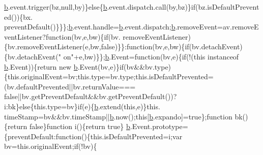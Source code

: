 \begin{DoxyCode}
      \hyperlink{docs_2_programmer's_manual_2html_2jquery_8js_aa4026ad5544b958e54ce5e106fa1c805}{b}.event.trigger(bz,null,by)\}\textcolor{keywordflow}{else}\{\hyperlink{docs_2_programmer's_manual_2html_2jquery_8js_aa4026ad5544b958e54ce5e106fa1c805}{b}.event.dispatch.call(by,bz)\}\textcolor{keywordflow}{if}(bz.isDefaultPrevented())\{bx.
      preventDefault()\}\}\};\hyperlink{docs_2_programmer's_manual_2html_2jquery_8js_aa4026ad5544b958e54ce5e106fa1c805}{b}.event.handle=\hyperlink{docs_2_programmer's_manual_2html_2jquery_8js_aa4026ad5544b958e54ce5e106fa1c805}{b}.event.dispatch;\hyperlink{docs_2_programmer's_manual_2html_2jquery_8js_aa4026ad5544b958e54ce5e106fa1c805}{b}.removeEvent=av.removeEventListener?\textcolor{keyword}{function}(bv,e,bw)\{\textcolor{keywordflow}{if}(bv.
      removeEventListener)\{bv.removeEventListener(e,bw,\textcolor{keyword}{false})\}\}:\textcolor{keyword}{function}(bv,e,bw)\{\textcolor{keywordflow}{if}(bv.detachEvent)\{bv.detachEvent(\textcolor{stringliteral}{"
      on"}+e,bw)\}\};\hyperlink{docs_2_programmer's_manual_2html_2jquery_8js_aa4026ad5544b958e54ce5e106fa1c805}{b}.Event=\textcolor{keyword}{function}(bv,e)\{\textcolor{keywordflow}{if}(!(\textcolor{keyword}{this} instanceof \hyperlink{docs_2_programmer's_manual_2html_2jquery_8js_aa4026ad5544b958e54ce5e106fa1c805}{b}.Event))\{\textcolor{keywordflow}{return} \textcolor{keyword}{new} \hyperlink{docs_2_programmer's_manual_2html_2jquery_8js_aa4026ad5544b958e54ce5e106fa1c805}{b}.Event(bv,e)\}\textcolor{keywordflow}{if}(bv&&bv.type)
      \{this.originalEvent=bv;this.type=bv.type;this.isDefaultPrevented=(bv.defaultPrevented||bv.returnValue===\textcolor{keyword}{
      false}||bv.getPreventDefault&&bv.getPreventDefault())?i:bk\}\textcolor{keywordflow}{else}\{this.type=bv\}\textcolor{keywordflow}{if}(e)\{\hyperlink{docs_2_programmer's_manual_2html_2jquery_8js_aa4026ad5544b958e54ce5e106fa1c805}{b}.extend(\textcolor{keyword}{this},e)\}this.
      timeStamp=bv&&bv.timeStamp||\hyperlink{docs_2_programmer's_manual_2html_2jquery_8js_aa4026ad5544b958e54ce5e106fa1c805}{b}.now();\textcolor{keyword}{this}[\hyperlink{docs_2_programmer's_manual_2html_2jquery_8js_aa4026ad5544b958e54ce5e106fa1c805}{b}.expando]=\textcolor{keyword}{true}\};\textcolor{keyword}{function} bk()\{\textcolor{keywordflow}{return} \textcolor{keyword}{false}\}\textcolor{keyword}{function} i()\{\textcolor{keywordflow}{return} \textcolor{keyword}{true}\}
      \hyperlink{docs_2_programmer's_manual_2html_2jquery_8js_aa4026ad5544b958e54ce5e106fa1c805}{b}.Event.prototype=\{preventDefault:\textcolor{keyword}{function}()\{this.isDefaultPrevented=i;var bv=this.originalEvent;\textcolor{keywordflow}{if}(!bv)\{\textcolor{keywordflow}{
}
\end{DoxyCode}
